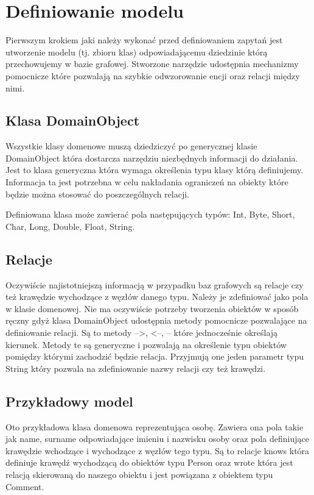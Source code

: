 \documentclass[brudnopis]{xmgr}
\begin{document}
\section{Definiowanie modelu}

Pierwszym krokiem jaki należy wykonać przed definiowaniem zapytań jest utworzenie modelu (tj. zbioru klas) odpowiadającemu dziedzinie którą przechowujemy w bazie grafowej. Stworzone narzędzie udostępnia mechanizmy pomocnicze które pozwalają na szybkie odwzorowanie encji oraz relacji między nimi.

\subsection{Klasa DomainObject}

Wszystkie klasy domenowe muszą dziedziczyć po generycznej klasie DomainObject która dostarcza narzędziu niezbędnych informacji do działania. Jest to klasa generyczna która wymaga określenia typu klasy którą definiujemy. Informacja ta jest potrzebna w celu nakładania ograniczeń na obiekty które będzie można stosować do poszczególnych relacji.

Definiowana klasa może zawierać pola następujących typów: Int, Byte, Short, Char, Long, Double, Float, String.

\subsection{Relacje}

Oczywiście najistotniejszą informacją w przypadku baz grafowych są relacje czy też krawędzie wychodzące z węzłów danego typu. Należy je zdefiniować jako pola w klasie domenowej. Nie ma oczywiście potrzeby tworzenia obiektów w sposób ręczny gdyż klasa DomainObject udostępnia metody pomocnicze pozwalające na definiowanie relacji. Są to metody  -->, <--, -- które jednocześnie określają kierunek. Metody te są generyczne i pozwalają na określenie typu obiektów pomiędzy którymi zachodzić będzie relacja. Przyjmują one jeden parametr typu String który pozwala na zdefiniowanie nazwy relacji czy też krawędzi.

\subsection{Przykładowy model}

Oto przykładowa klasa domenowa reprezentująca osobę. Zawiera ona pola takie jak name, surname odpowiadające imieniu i nazwisku osoby oraz pola definiujące krawędzie wchodzące i wychodzące z węzłów tego typu. Są to relacje knows która definiuje krawędź wychodzącą do obiektów typu Person oraz wrote która jest relacją skierowaną do naszego obiektu i jest powiązana z obiektem typu Comment.
\end{document}
